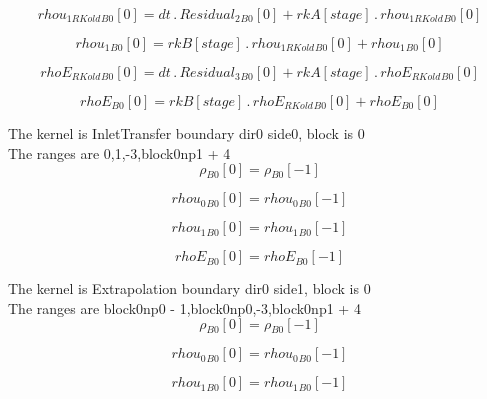 \documentclass{article}
\begin{document}
\begin{dmath}{rhou_{1 RKold}{_{B0}}}[{0}] = dt \,.\, {Residual_{2}{_{B0}}}[{0}] + {rkA}[{stage}] \,.\, {rhou_{1 RKold}{_{B0}}}[{0}]\end{dmath}

\begin{dmath}{rhou_{1}{_{B0}}}[{0}] = {rkB}[{stage}] \,.\, {rhou_{1 RKold}{_{B0}}}[{0}] + {rhou_{1}{_{B0}}}[{0}]\end{dmath}

\begin{dmath}{rhoE_{RKold}{_{B0}}}[{0}] = dt \,.\, {Residual_{3}{_{B0}}}[{0}] + {rkA}[{stage}] \,.\, {rhoE_{RKold}{_{B0}}}[{0}]\end{dmath}

\begin{dmath}{rhoE{_{B0}}}[{0}] = {rkB}[{stage}] \,.\, {rhoE_{RKold}{_{B0}}}[{0}] + {rhoE{_{B0}}}[{0}]\end{dmath}

\noindent The kernel is InletTransfer boundary dir0 side0, block is 0\\\noindent The ranges are 0,1,-3,block0np1 + 4\\\begin{dmath}{\rho{_{B0}}}[{0}] = {\rho{_{B0}}}[{-1}]\end{dmath}

\begin{dmath}{rhou_{0}{_{B0}}}[{0}] = {rhou_{0}{_{B0}}}[{-1}]\end{dmath}

\begin{dmath}{rhou_{1}{_{B0}}}[{0}] = {rhou_{1}{_{B0}}}[{-1}]\end{dmath}

\begin{dmath}{rhoE{_{B0}}}[{0}] = {rhoE{_{B0}}}[{-1}]\end{dmath}

\noindent The kernel is Extrapolation boundary dir0 side1, block is 0\\\noindent The ranges are block0np0 - 1,block0np0,-3,block0np1 + 4\\\begin{dmath}{\rho{_{B0}}}[{0}] = {\rho{_{B0}}}[{-1}]\end{dmath}

\begin{dmath}{rhou_{0}{_{B0}}}[{0}] = {rhou_{0}{_{B0}}}[{-1}]\end{dmath}

\begin{dmath}{rhou_{1}{_{B0}}}[{0}] = {rhou_{1}{_{B0}}}[{-1}]\end{dmath}
\end{document}
